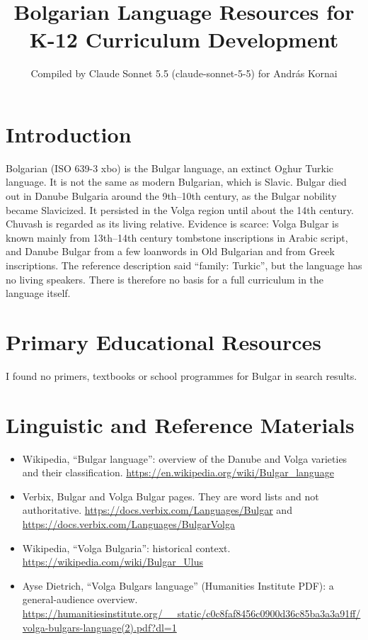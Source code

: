 \documentclass[12pt]{article}
\title{Bolgarian Language Resources for K-12 Curriculum Development}
\author{Compiled by Claude Sonnet 5.5 (claude-sonnet-5-5) for Andr\'as Kornai}
\date{}
\begin{document}
\maketitle

\section{Introduction}
Bolgarian (ISO 639-3 xbo) is the Bulgar language, an extinct Oghur Turkic language. It is not the same as modern Bulgarian, which is Slavic. Bulgar died out in Danube Bulgaria around the 9th--10th century, as the Bulgar nobility became Slavicized. It persisted in the Volga region until about the 14th century. Chuvash is regarded as its living relative. Evidence is scarce: Volga Bulgar is known mainly from 13th--14th century tombstone inscriptions in Arabic script, and Danube Bulgar from a few loanwords in Old Bulgarian and from Greek inscriptions. The reference description said ``family: Turkic'', but the language has no living speakers. There is therefore no basis for a full curriculum in the language itself.

\section{Primary Educational Resources}
I found no primers, textbooks or school programmes for Bulgar in search results.

\section{Linguistic and Reference Materials}
\begin{itemize}
\item Wikipedia, ``Bulgar language'': overview of the Danube and Volga varieties and their classification. \url{https://en.wikipedia.org/wiki/Bulgar_language}
\item Verbix, Bulgar and Volga Bulgar pages. They are word lists and not authoritative. \url{https://docs.verbix.com/Languages/Bulgar} and \url{https://docs.verbix.com/Languages/BulgarVolga}
\item Wikipedia, ``Volga Bulgaria'': historical context. \url{https://wikipedia.com/wiki/Bulgar_Ulus}
\item Ayse Dietrich, ``Volga Bulgars language'' (Humanities Institute PDF): a general-audience overview. \url{https://humanitiesinstitute.org/__static/c0c8faf8456c0900d36c85ba3a3a91ff/volga-bulgars-language(2).pdf?dl=1}
\end{itemize}
\end{document}
